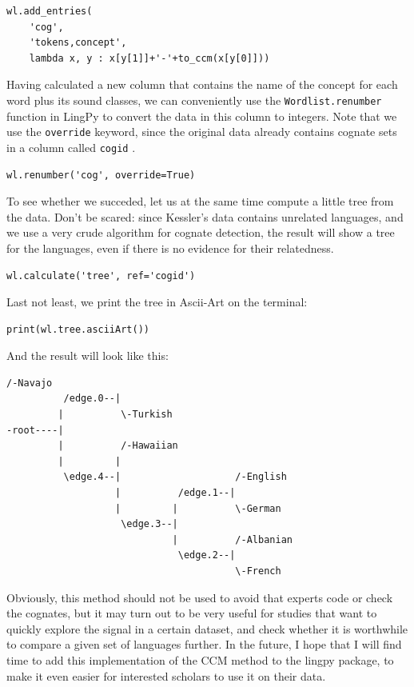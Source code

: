 \documentclass[
  a4paper,
  14pt,
  oneside,
  tablecaptionabove
]{scrbook}
\begin{document}
\begin{lstlisting}[basicstyle=\small]
wl.add_entries(
    'cog', 
    'tokens,concept', 
    lambda x, y : x[y[1]]+'-'+to_ccm(x[y[0]]))
\end{lstlisting}

Having calculated a new column that contains the name of the concept for
each word plus its sound classes, we can conveniently use the
\lstinline!Wordlist.renumber! function in LingPy to convert the data in
this column to integers. Note that we use the \lstinline!override!
keyword, since the original data already contains cognate sets in a
column called \lstinline!cogid! .

\begin{lstlisting}[basicstyle=\small]
wl.renumber('cog', override=True)
\end{lstlisting}

To see whether we succeded, let us at the same time compute a little
tree from the data. Don't be scared: since Kessler's data contains
unrelated languages, and we use a very crude algorithm for cognate
detection, the result will show a tree for the languages, even if there
is no evidence for their relatedness.

\begin{lstlisting}[basicstyle=\small]
wl.calculate('tree', ref='cogid')
\end{lstlisting}

Last not least, we print the tree in Ascii-Art on the terminal:

\begin{lstlisting}[basicstyle=\small]
print(wl.tree.asciiArt())
\end{lstlisting}

And the result will look like this:

\begin{lstlisting}[basicstyle=\small]
                    /-Navajo
          /edge.0--|
         |          \-Turkish
-root----|
         |          /-Hawaiian
         |         |
          \edge.4--|                    /-English
                   |          /edge.1--|
                   |         |          \-German
                    \edge.3--|
                             |          /-Albanian
                              \edge.2--|
                                        \-French
\end{lstlisting}

Obviously, this method should not be used to avoid that experts code or
check the cognates, but it may turn out to be very useful for studies
that want to quickly explore the signal in a certain dataset, and check
whether it is worthwhile to compare a given set of languages further. In
the future, I hope that I will find time to add this implementation of
the CCM method to the lingpy package, to make it even easier for
interested scholars to use it on their data.
\end{document}
